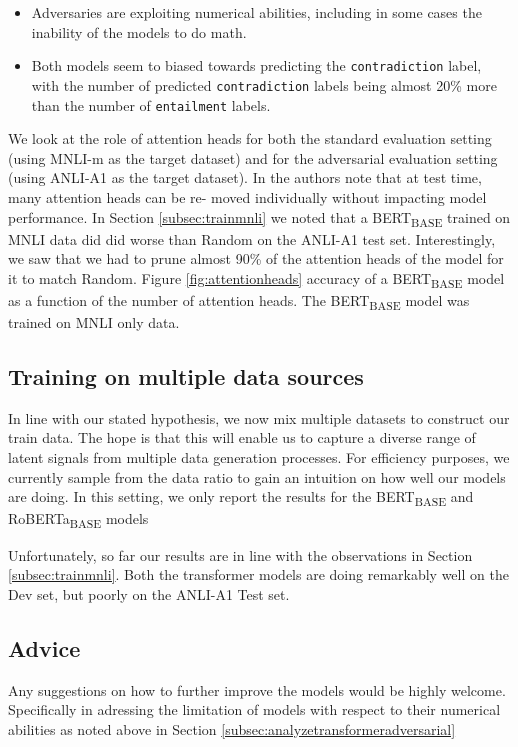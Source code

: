 \begin{itemize}
	\item Adversaries are exploiting numerical abilities, including in some cases the inability of the models to do math.  
	\item Both models seem to biased towards predicting the \texttt{contradiction} label, with the number of predicted \texttt{contradiction} labels being almost 20\% more than the number of \texttt{entailment} labels.
	
\end{itemize}

 We look at the role of attention heads for both the standard evaluation setting (using MNLI-m as the target dataset) and for the adversarial evaluation setting (using ANLI-A1 as the target dataset). In \cite{michel2019sixteen} the authors note that at test time, many attention heads can be re-
moved individually without impacting model performance. In Section \ref{subsec:trainmnli} we noted that a BERT\textsubscript{BASE} trained on MNLI data did did worse than Random on the ANLI-A1 test set. Interestingly, we saw that we had to prune almost 90\% of the attention heads of the model for it to match Random. Figure \ref{fig:attentionheads} accuracy of a BERT\textsubscript{BASE} model as a function of the number of attention heads. The BERT\textsubscript{BASE} model was trained on MNLI only data.

\subsection{Training on multiple data sources}
\label{subsec:trainmultiple}

In line with our stated hypothesis, we now mix multiple datasets to construct our train data. The hope is that this will enable us to capture a diverse range of latent signals from multiple data generation processes. For efficiency purposes, we currently sample from the data ratio to gain an intuition on how well our models are doing. In this setting, we only report the results for the BERT\textsubscript{BASE} and RoBERTa\textsubscript{BASE} models

Unfortunately, so far our results are in line with the observations in Section \ref{subsec:trainmnli}. Both the transformer models are doing remarkably well on the Dev set, but poorly on the ANLI-A1 Test set.

\subsection{Advice}
\label{subsec:advice}

Any suggestions on how to further improve the models would be highly welcome. Specifically in adressing the limitation of models with respect to their numerical abilities as noted above in Section \ref{subsec:analyzetransformeradversarial}
